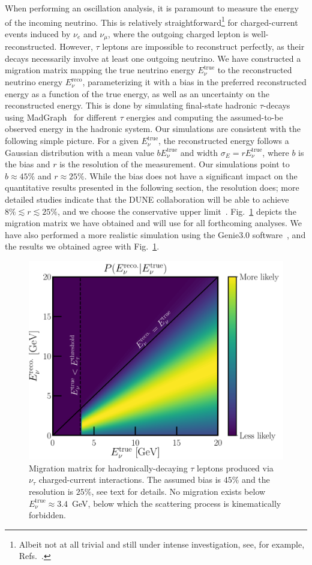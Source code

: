 \documentclass[aps,prd,onecolumn,nofootinbib,superscriptaddress, 11pt]{revtex4}
\begin{document}
When performing an oscillation analysis, it is paramount to measure the energy of the incoming neutrino. This is relatively straightforward\footnote{Albeit not at all trivial and still under intense investigation, see, for example, Refs.~\cite{DeRomeri:2016qwo,Friedland:2018vry}.} for charged-current events induced by $\nu_e$ and $\nu_\mu$, where the outgoing charged lepton is well-reconstructed. However, $\tau$ leptons are impossible to reconstruct perfectly, as their decays necessarily involve at least one outgoing neutrino. We have constructed a migration matrix mapping the true neutrino energy $E_\nu^\mathrm{true}$ to the reconstructed neutrino energy $E_\nu^\mathrm{reco}$, parameterizing it with a bias in the preferred reconstructed energy as a function of the true energy, as well as an uncertainty on the reconstructed energy. This is done by simulating final-state hadronic $\tau$-decays using {\sc MadGraph}~\cite{Alwall:2014hca} for different $\tau$ energies and computing the assumed-to-be observed energy in the hadronic system. Our simulations are consistent with the following simple picture. For a given $E_\nu^\mathrm{true}$, the reconstructed energy follows a Gaussian distribution with a mean value $bE_\nu^\mathrm{true}$ and width $\sigma_E = rE_\nu^\mathrm{true}$, where $b$ is the bias and $r$ is the resolution of the measurement. Our simulations point to $b \approx 45\%$ and $r \approx 25\%$. While the bias does not have a significant impact on the quantitative results presented in the following section, the resolution does; more detailed studies indicate that the DUNE collaboration will be able to achieve $8\% \lesssim r \lesssim 25\%$, and we choose the conservative upper limit~\cite{AdamComm}. Fig.~\ref{fig:MM} depicts the migration matrix we have obtained and will use for all forthcoming analyses. We have also performed a more realistic simulation using the {\sc Genie3.0} software~\cite{Andreopoulos:2015wxa}, and the results we obtained agree with Fig.~\ref{fig:MM}.
\begin{figure}[ht]
\centering
\includegraphics[width=0.6\linewidth]{MigrationMatrix.pdf}
\caption{Migration matrix for hadronically-decaying $\tau$ leptons produced via $\nu_\tau$ charged-current interactions. The assumed bias is $45\%$ and the resolution is $25\%$, see text for details. No migration exists below $E_\nu^{\mathrm{true}} \approx 3.4$~GeV, below which the scattering process is kinematically forbidden.}
\label{fig:MM}
\end{figure}
\end{document}
